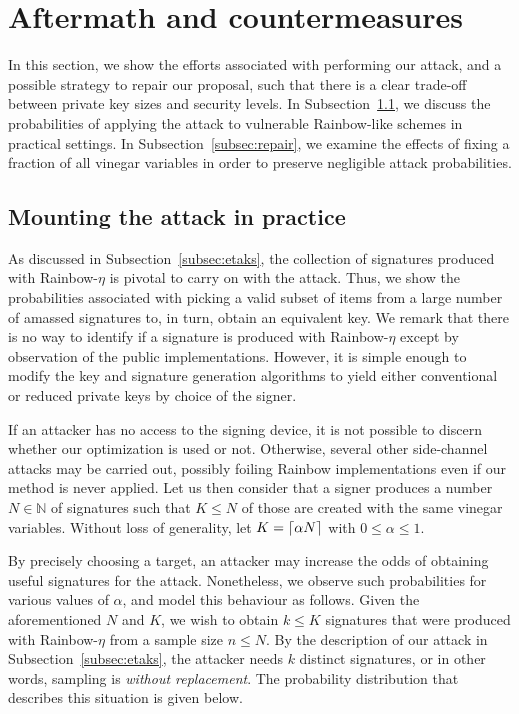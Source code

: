 \documentclass[12pt, a4paper, oneside]{memoir}
\DeclarePairedDelimiter{\ceil}{\lceil}{\rceil}
\theoremstyle{definition}
\begin{document}
\section{Aftermath and countermeasures}\label{sec:counter}

In this section, we show the efforts associated with performing our attack, and a possible strategy to repair our proposal, such that there is a clear trade-off between private key sizes and security levels. In Subsection~\ref{subsec:mount}, we discuss the probabilities of applying the attack to vulnerable Rainbow-like schemes in practical settings. In Subsection~\ref{subsec:repair}, we examine the effects of fixing a fraction of all vinegar variables in order to preserve negligible attack probabilities.

\subsection{Mounting the attack in practice}\label{subsec:mount}

As discussed in Subsection~\ref{subsec:etaks}, the collection of signatures produced with Rainbow-$\eta$ is pivotal to carry on with the attack. Thus, we show the probabilities associated with picking a valid subset of items from a large number of amassed signatures to, in turn, obtain an equivalent key. We remark that there is no way to identify if a signature is produced with Rainbow-$\eta$ except by observation of the public implementations. However, it is simple enough to modify the key and signature generation algorithms to yield either conventional or reduced private keys by choice of the signer. 

If an attacker has no access to the signing device, it is not possible to discern whether our optimization is used or not. Otherwise, several other side-channel attacks may be carried out, possibly foiling Rainbow implementations even if our method is never applied. Let us then consider that a signer produces a number $N \in \mathbb{N}$ of signatures such that $K \leq N$ of those are created with the same vinegar variables. Without loss of generality, let $K = \ceil{\alpha N}$ with $0 \leq \alpha \leq 1$.

By precisely choosing a target, an attacker may increase the odds of obtaining useful signatures for the attack. Nonetheless, we observe such probabilities for various values of $\alpha$, and model this behaviour as follows. Given the aforementioned $N$ and $K$, we wish to obtain $k \leq K$ signatures that were produced with Rainbow-$\eta$ from a sample size $n \leq N$. By the description of our attack in Subsection~\ref{subsec:etaks}, the attacker needs $k$ distinct signatures, or in other words, sampling is \emph{without replacement}. The probability distribution that describes this situation is given below.
\end{document}
